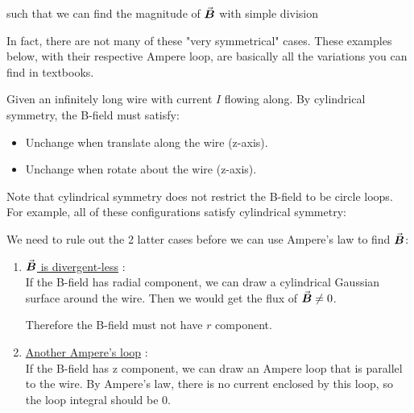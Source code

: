 \documentclass[class=article, crop=false, 12pt]{standalone}
\begin{document}
such that we can find the magnitude of $\va*{B}$ with simple division

In fact, there are not many of these "very symmetrical" cases.
These examples below, with their respective Ampere loop,
are basically all the variations you can find in textbooks.


\begin{example}
    Given an infinitely long wire with current $I$ flowing along.
    By cylindrical symmetry, the B-field must satisfy:
    \begin{itemize}
        \item Unchange when translate along the wire (z-axis).
        \item Unchange when rotate about the wire (z-axis).
    \end{itemize}
    
    Note that cylindrical symmetry does not restrict the B-field to be circle loops.
    For example, all of these configurations satisfy cylindrical symmetry:


    We need to rule out the 2 latter cases before we can use Ampere's law to find $\va*{B}$:

    \begin{enumerate}
        \item \ul{$\va*{B}$ is divergent-less} : \\
        If the B-field has radial component,
        we can draw a cylindrical Gaussian surface around the wire.
        Then we would get the flux of $\va*{B} \neq 0$.


        Therefore the B-field must not have $r$ component.

        \item \ul{Another Ampere's loop} : \\
        If the B-field has z component, 
        we can draw an Ampere loop that is parallel to the wire.
        By Ampere's law, there is no current enclosed by this loop,
        so the loop integral should be $0$.



\end{enumerate}
\end{example}
\end{document}
